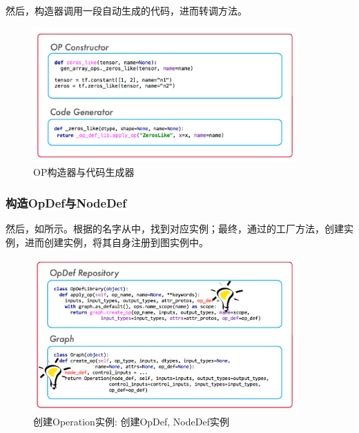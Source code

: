 \begin{content}
然后，构造器调用一段自动生成的代码，进而转调方法。

\begin{figure}[!htbp]
\centering
\includegraphics[width=0.9\textwidth]{figures/py-op-constructor.png}
\caption{OP构造器与代码生成器}
 \label{fig:py-op-constructor}
\end{figure}

\subsubsection{构造OpDef与NodeDef}

然后，如所示。根据的名字从中，找到对应实例；最终，通过的工厂方法，创建实例，进而创建实例，将其自身注册到图实例中。

\begin{figure}[!htbp]
\centering
\includegraphics[width=0.9\textwidth]{figures/py-graph-create-op.png}
\caption{创建Operation实例: 创建OpDef, NodeDef实例}
 \label{fig:py-graph-create-op}
\end{figure}

\end{content}

